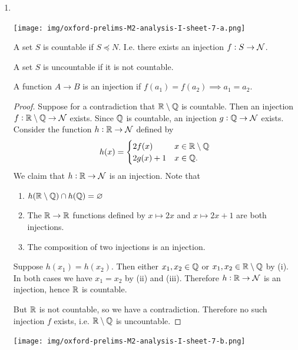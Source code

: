 \begin{enumerate}
  \newpage
\item~
  \begin{mdframed}
    \texttt{[image: img/oxford-prelims-M2-analysis-I-sheet-7-a.png]}
  \end{mdframed}
  \begin{definition*}[Countable]
    A set $S$ is countable if $S \preceq N$. I.e. there exists an injection $f:S \to \mathcal{N}$.
  \end{definition*}
  \begin{definition*}[Uncountable]
    A set $S$ is uncountable if it is not countable.
  \end{definition*}
  \begin{definition*}[Injection]
    A function $A \to B$ is an injection if $f(a_1) = f(a_2) \implies a_1 = a_2$.
  \end{definition*}
  \begin{proof}
    Suppose for a contradiction that $\mathbb{R} \setminus \mathbb{Q}$ is countable. Then an injection
    $f:\mathbb{R} \setminus \mathbb{Q} \to \mathcal{N}$ exists. Since $\mathbb{Q}$ is countable, an injection $g:\mathbb{Q} \to \mathcal{N}$
    exists. Consider the function $h:\mathbb{R} \to \mathcal{N}$ defined by
    \begin{align*}
      h(x) =
      \begin{cases}
        2f(x) &x \in \mathbb{R} \setminus \mathbb{Q}\\
        2g(x) + 1 &x \in \mathbb{Q}.
      \end{cases}
    \end{align*}
    We claim that $h:\mathbb{R} \to \mathcal{N}$ is an injection. Note that
    \begin{enumerate}[label=(\roman*)]
    \item $h(\mathbb{R}\setminus\mathbb{Q}) \cap h(\mathbb{Q}) = \varnothing$
    \item The $\mathbb{R} \to \mathbb{R}$ functions defined by $x \mapsto 2x$ and $x \mapsto 2x + 1$ are both
      injections.
    \item The composition of two injections is an injection.
    \end{enumerate}
    Suppose $h(x_1) = h(x_2)$. Then either $x_1, x_2 \in \mathbb{Q}$ or $x_1, x_2 \in \mathbb{R}\setminus\mathbb{Q}$ by
    (i). In both cases we have $x_1 = x_2$ by (ii) and (iii). Therefore $h:\mathbb{R} \to \mathcal{N}$ is an
    injection, hence $\mathbb{R}$ is countable.

    But $\mathbb{R}$ is not countable, so we have a contradiction. Therefore no such injection $f$ exists,
    i.e. $\mathbb{R}\setminus\mathbb{Q}$ is uncountable.
  \end{proof}

  \begin{mdframed}
    \texttt{[image: img/oxford-prelims-M2-analysis-I-sheet-7-b.png]}
  \end{mdframed}


\end{enumerate}
